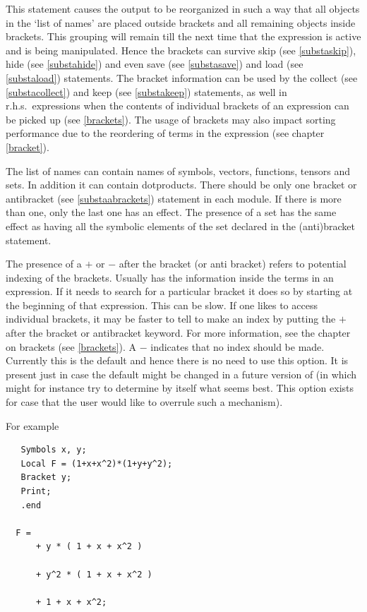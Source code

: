 \noindent This statement causes the output to be reorganized in such a way 
that all objects in the `list of names' are placed outside 
brackets and all remaining objects inside 
brackets. This grouping will remain till the next time that 
the expression is active and is being manipulated. Hence the brackets can 
survive skip (see \ref{substaskip}), hide (see \ref{substahide}) and even 
save (see \ref{substasave}) and load (see \ref{substaload}) statements. The 
bracket information can be used by the collect (see \ref{substacollect}) 
and keep (see \ref{substakeep}) statements, as well in r.h.s.\ expressions 
when the contents of individual brackets of an expression can be picked up 
(see \ref{brackets}). The usage of brackets may also impact sorting
performance due to the reordering of terms in the expression (see 
chapter \ref{bracket}). \vspace{4mm}

\noindent The list of names can contain names of symbols, vectors, 
functions, tensors and sets. In addition it can contain dotproducts. There 
should be only one bracket or antibracket (see \ref{substaabrackets}) 
statement in each module. If there is more than one, only the last one has 
an effect. The presence of a set has the same effect as having all the 
symbolic elements of the set declared in the (anti)bracket 
statement.\vspace{4mm}

\noindent The presence of a $+$ or $-$ after the bracket (or anti bracket) 
refers to potential indexing of the brackets. 
Usually {\FORM} has the information inside the terms in an expression. If 
it needs to search for a particular bracket it does so by starting at the 
beginning of that expression. This can be slow. If one likes to access 
individual brackets, it may be faster to tell {\FORM} to make an index by 
putting the $+$ after the bracket or antibracket keyword. For more 
information, see the chapter on brackets (see \ref{brackets}). A $-$ 
indicates that no index should be made. Currently this is the default and 
hence there is no need to use this option. It is present just in case the 
default might be changed in a future version of {\FORM} (in which {\FORM} 
might for instance try to determine by itself what seems best. This option 
exists for case that the user would like to overrule such a mechanism). 
\vspace{4mm}

\noindent For example
\begin{verbatim}
   Symbols x, y;
   Local F = (1+x+x^2)*(1+y+y^2);
   Bracket y;
   Print;
   .end

  F =
      + y * ( 1 + x + x^2 )

      + y^2 * ( 1 + x + x^2 )

      + 1 + x + x^2;
\end{verbatim}

